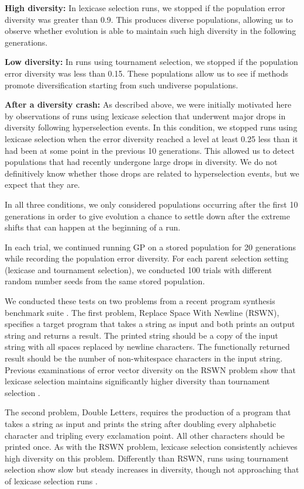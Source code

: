\documentclass{sig-alternate-05-2015}
\begin{document}
{\bf High diversity:}
In lexicase selection runs, we stopped if the population error diversity was greater than 0.9. This produces diverse populations, allowing us to observe whether evolution is able to maintain such high diversity in the following generations.

{\bf Low diversity:}
In runs using tournament selection, we stopped if the population error diversity was less than 0.15. These populations allow us to see if methods promote diversification starting from such undiverse populations.

{\bf After a diversity crash:}
As described above, we were initially motivated here by observations of runs using lexicase selection that underwent major drops in diversity following hyperselection events. In this condition, we stopped runs using lexicase selection when the error diversity reached a level at least 0.25 less than it had been at some point in the previous 10 generations. This allowed us to detect populations that had recently undergone large drops in diversity. We do not definitively know whether those drops are related to hyperselection events, but we expect that they are.

In all three conditions, we only considered populations occurring after the first 10 generations in order to give evolution a chance to settle down after the extreme shifts that can happen at the beginning of a run.

In each trial, we continued running GP on a stored population for 20 generations while recording the population error diversity. For each parent selection setting (lexicase and tournament selection), we conducted 100 trials with different random number seeds from the same stored population.

We conducted these tests on two problems from a recent program synthesis benchmark suite \cite{Helmuth:2015:GECCO}. The first problem, Replace Space With Newline (RSWN), specifies a target program that takes a string as input and both prints an output string and returns a result. The printed string should be a copy of the input string with all spaces replaced by newline characters. The functionally returned result should be the number of non-whitespace characters in the input string. Previous examinations of error vector diversity on the RSWN problem show that lexicase selection maintains significantly higher diversity than tournament selection \cite{Helmuth:2015:GPTP}.

The second problem, Double Letters, requires the production of a program that takes a string as input and prints the string after doubling every alphabetic character and tripling every exclamation point. All other characters should be printed once. As with the RSWN problem, lexicase selection consistently achieves high diversity on this problem. Differently than RSWN, runs using tournament selection show slow but steady increases in diversity, though not approaching that of lexicase selection runs \cite{Helmuth:2015:GPTP}.
\end{document}
